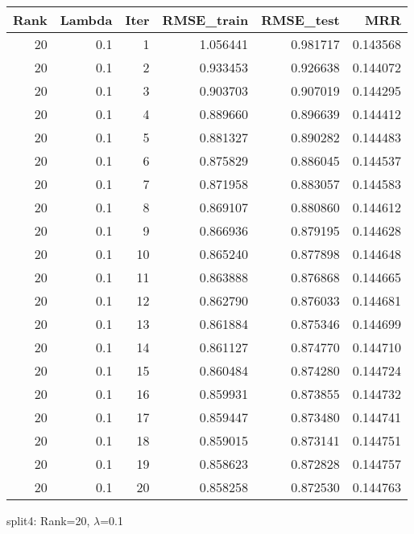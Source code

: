\begin{tabular}{rrrrrr}
\toprule
 Rank &  Lambda &  Iter &  RMSE\_train &  RMSE\_test &       MRR \\
\midrule
   20 &     0.1 &     1 &    1.056441 &   0.981717 &  0.143568 \\
   20 &     0.1 &     2 &    0.933453 &   0.926638 &  0.144072 \\
   20 &     0.1 &     3 &    0.903703 &   0.907019 &  0.144295 \\
   20 &     0.1 &     4 &    0.889660 &   0.896639 &  0.144412 \\
   20 &     0.1 &     5 &    0.881327 &   0.890282 &  0.144483 \\
   20 &     0.1 &     6 &    0.875829 &   0.886045 &  0.144537 \\
   20 &     0.1 &     7 &    0.871958 &   0.883057 &  0.144583 \\
   20 &     0.1 &     8 &    0.869107 &   0.880860 &  0.144612 \\
   20 &     0.1 &     9 &    0.866936 &   0.879195 &  0.144628 \\
   20 &     0.1 &    10 &    0.865240 &   0.877898 &  0.144648 \\
   20 &     0.1 &    11 &    0.863888 &   0.876868 &  0.144665 \\
   20 &     0.1 &    12 &    0.862790 &   0.876033 &  0.144681 \\
   20 &     0.1 &    13 &    0.861884 &   0.875346 &  0.144699 \\
   20 &     0.1 &    14 &    0.861127 &   0.874770 &  0.144710 \\
   20 &     0.1 &    15 &    0.860484 &   0.874280 &  0.144724 \\
   20 &     0.1 &    16 &    0.859931 &   0.873855 &  0.144732 \\
   20 &     0.1 &    17 &    0.859447 &   0.873480 &  0.144741 \\
   20 &     0.1 &    18 &    0.859015 &   0.873141 &  0.144751 \\
   20 &     0.1 &    19 &    0.858623 &   0.872828 &  0.144757 \\
   20 &     0.1 &    20 &    0.858258 &   0.872530 &  0.144763 \\
\bottomrule
\end{tabular}

\caption{split4: Rank=20, $\lambda$=0.1}
